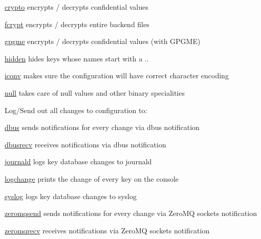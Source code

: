 \begin{DoxyItemize}
\item \mbox{\hyperlink{autotoc_md113_src_plugins_crypto_README_md}{crypto}} encrypts / decrypts confidential values
\item \mbox{\hyperlink{autotoc_md207_src_plugins_fcrypt_README_md}{fcrypt}} encrypts / decrypts entire backend files
\item \mbox{\hyperlink{autotoc_md250_src_plugins_gpgme_README_md}{gpgme}} encrypts / decrypts confidential values (with G\+P\+G\+ME)
\item \mbox{\hyperlink{autotoc_md267_src_plugins_hidden_README_md}{hidden}} hides keys whose names start with a {\ttfamily .}.
\item \mbox{\hyperlink{autotoc_md285_src_plugins_iconv_README_md}{iconv}} makes sure the configuration will have correct character encoding
\item \mbox{\hyperlink{autotoc_md511_src_plugins_null_README_md}{null}} takes care of null values and other binary specialities
\end{DoxyItemize}

Log/\+Send out all changes to configuration to\+:


\begin{DoxyItemize}
\item \mbox{\hyperlink{autotoc_md162_src_plugins_dbus_README_md}{dbus}} sends notifications for every change via dbus {\ttfamily notification}
\item \mbox{\hyperlink{autotoc_md174_src_plugins_dbusrecv_README_md}{dbusrecv}} receives notifications via dbus {\ttfamily notification}
\item \mbox{\hyperlink{autotoc_md351_src_plugins_journald_README_md}{journald}} logs key database changes to journald
\item \mbox{\hyperlink{autotoc_md388_src_plugins_logchange_README_md}{logchange}} prints the change of every key on the console
\item \mbox{\hyperlink{autotoc_md665_src_plugins_syslog_README_md}{syslog}} logs key database changes to syslog
\item \mbox{\hyperlink{autotoc_md910_src_plugins_zeromqsend_README_md}{zeromqsend}} sends notifications for every change via Zero\+MQ sockets {\ttfamily notification}
\item \mbox{\hyperlink{autotoc_md904_src_plugins_zeromqrecv_README_md}{zeromqrecv}} receives notifications via Zero\+MQ sockets {\ttfamily notification}
\end{DoxyItemize}

